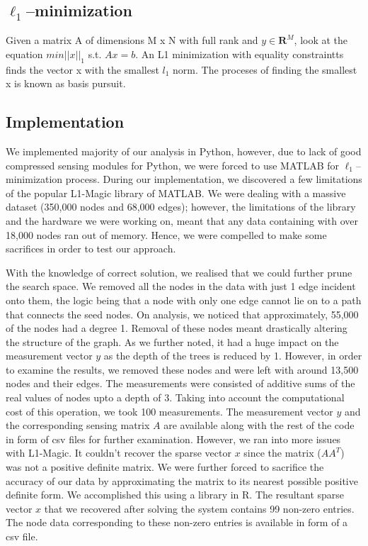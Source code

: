 \documentclass{article} %
\begin{document}
\subsection{$\ell_1$--minimization}

Given a matrix  A of dimensions M x N with full rank and $y \in \mathbf{R}^M$, look at the equation $min ||x||_1$ s.t. $Ax=b$. An L1 minimization with equality constraintts finds the vector x with the smallest $l_1$ norm. The proceses of finding the smallest x is known as basis pursuit.

\subsection{Implementation}

We implemented majority of our analysis in Python, however, due to lack of good compressed sensing modules for Python, we were forced to use MATLAB for $\ell_1$--minimization process. During our implementation, we discovered a few limitations of the popular L1-Magic library of MATLAB. We were dealing with a massive dataset (350,000 nodes and 68,000 edges); however, the limitations of the library and the hardware we were working on, meant that any data containing with over 18,000 nodes ran out of memory. Hence, we were compelled to make some sacrifices in order to test our approach. 

With the knowledge of correct solution, we realised that we could further prune the search space. We removed all the nodes in the data with just 1 edge incident onto them, the logic being that a node with only one edge cannot lie on to a path that connects the seed nodes. On analysis, we noticed that approximately, 55,000 of the nodes had a degree 1. Removal of these nodes meant drastically altering the structure of the graph. As we further noted, it had a huge impact on the measurement vector $y$ as the depth of the trees is reduced by 1. However, in order to examine the results, we removed these nodes and were left with around 13,500 nodes and their edges. The measurements were consisted of additive sums of the real values of nodes upto a depth of 3. Taking into account the computational cost of this operation, we took 100 measurements. The measurement vector $y$ and the corresponding sensing matrix $A$ are available along with the rest of the code in form of csv files for further examination. However, we ran into more issues with L1-Magic. It couldn't recover the sparse vector $x$ since the matrix ($AA^{T}$) was not a positive definite matrix. We were further forced to sacrifice the accuracy of our data by approximating the matrix to its nearest possible positive definite form. We accomplished this using a library in R. The resultant sparse vector $x$ that we recovered after solving the system contains 99 non-zero entries. The node data corresponding to these non-zero entries is available in form of a csv file. 
\end{document}
